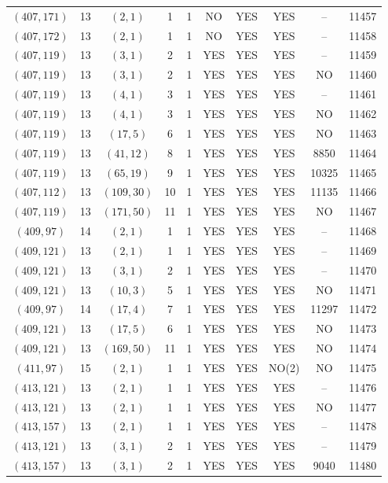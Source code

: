 \begin{longtable}{|c|c|c|c|c|c|c|c|c|c|}
$(407, 171)$ & 13 & $(2, 1)$ & 1 & 1 & NO & YES & YES & -- & 11457\\
$(407, 172)$ & 13 & $(2, 1)$ & 1 & 1 & NO & YES & YES & -- & 11458\\
$(407, 119)$ & 13 & $(3, 1)$ & 2 & 1 & YES & YES & YES & -- & 11459\\
$(407, 119)$ & 13 & $(3, 1)$ & 2 & 1 & YES & YES & YES & NO & 11460\\
$(407, 119)$ & 13 & $(4, 1)$ & 3 & 1 & YES & YES & YES & -- & 11461\\
$(407, 119)$ & 13 & $(4, 1)$ & 3 & 1 & YES & YES & YES & NO & 11462\\
$(407, 119)$ & 13 & $(17, 5)$ & 6 & 1 & YES & YES & YES & NO & 11463\\
$(407, 119)$ & 13 & $(41, 12)$ & 8 & 1 & YES & YES & YES & 8850 & 11464\\
$(407, 119)$ & 13 & $(65, 19)$ & 9 & 1 & YES & YES & YES & 10325 & 11465\\
$(407, 112)$ & 13 & $(109, 30)$ & 10 & 1 & YES & YES & YES & 11135 & 11466\\
$(407, 119)$ & 13 & $(171, 50)$ & 11 & 1 & YES & YES & YES & NO & 11467\\
$(409, 97)$ & 14 & $(2, 1)$ & 1 & 1 & YES & YES & YES & -- & 11468\\
$(409, 121)$ & 13 & $(2, 1)$ & 1 & 1 & YES & YES & YES & -- & 11469\\
$(409, 121)$ & 13 & $(3, 1)$ & 2 & 1 & YES & YES & YES & -- & 11470\\
$(409, 121)$ & 13 & $(10, 3)$ & 5 & 1 & YES & YES & YES & NO & 11471\\
$(409, 97)$ & 14 & $(17, 4)$ & 7 & 1 & YES & YES & YES & 11297 & 11472\\
$(409, 121)$ & 13 & $(17, 5)$ & 6 & 1 & YES & YES & YES & NO & 11473\\
$(409, 121)$ & 13 & $(169, 50)$ & 11 & 1 & YES & YES & YES & NO & 11474\\
$(411, 97)$ & 15 & $(2, 1)$ & 1 & 1 & YES & YES & NO(2) & NO & 11475\\
$(413, 121)$ & 13 & $(2, 1)$ & 1 & 1 & YES & YES & YES & -- & 11476\\
$(413, 121)$ & 13 & $(2, 1)$ & 1 & 1 & YES & YES & YES & NO & 11477\\
$(413, 157)$ & 13 & $(2, 1)$ & 1 & 1 & YES & YES & YES & -- & 11478\\
$(413, 121)$ & 13 & $(3, 1)$ & 2 & 1 & YES & YES & YES & -- & 11479\\
$(413, 157)$ & 13 & $(3, 1)$ & 2 & 1 & YES & YES & YES & 9040 & 11480\\

\end{longtable}
